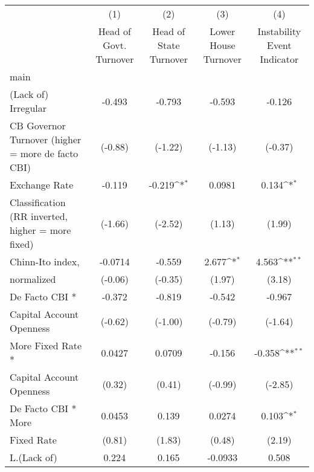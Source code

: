 {
\def\sym#1{\ifmmode^{#1}\else\(^{#1}\)\fi}
\begin{tabular}{l*{4}{c}}
\hline\hline
                    &\multicolumn{1}{c}{(1)}&\multicolumn{1}{c}{(2)}&\multicolumn{1}{c}{(3)}&\multicolumn{1}{c}{(4)}\\
                    &\multicolumn{1}{c}{Head of Govt. Turnover}&\multicolumn{1}{c}{Head of State Turnover}&\multicolumn{1}{c}{Lower House Turnover}&\multicolumn{1}{c}{Instability Event Indicator}\\
\hline
main                &                     &                     &                     &                     \\
(Lack of) Irregular &      -0.493         &      -0.793         &      -0.593         &      -0.126         \\
CB Governor Turnover (higher = more de facto CBI)&     (-0.88)         &     (-1.22)         &     (-1.13)         &     (-0.37)         \\
[1em]
Exchange Rate       &      -0.119         &      -0.219\sym{*}  &      0.0981         &       0.134\sym{*}  \\
Classification (RR inverted, higher = more fixed)&     (-1.66)         &     (-2.52)         &      (1.13)         &      (1.99)         \\
[1em]
Chinn-Ito index,    &     -0.0714         &      -0.559         &       2.677\sym{*}  &       4.563\sym{**} \\
normalized          &     (-0.06)         &     (-0.35)         &      (1.97)         &      (3.18)         \\
[1em]
De Facto CBI *      &      -0.372         &      -0.819         &      -0.542         &      -0.967         \\
Capital Account Openness&     (-0.62)         &     (-1.00)         &     (-0.79)         &     (-1.64)         \\
[1em]
More Fixed Rate *   &      0.0427         &      0.0709         &      -0.156         &      -0.358\sym{**} \\
Capital Account Openness&      (0.32)         &      (0.41)         &     (-0.99)         &     (-2.85)         \\
[1em]
De Facto CBI * More &      0.0453         &       0.139         &      0.0274         &       0.103\sym{*}  \\
Fixed Rate          &      (0.81)         &      (1.83)         &      (0.48)         &      (2.19)         \\
[1em]
L.(Lack of)         &       0.224         &       0.165         &     -0.0933         &       0.508         \\

\end{tabular}}
